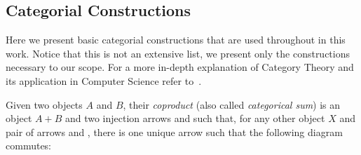 \subsection{Categorial Constructions}

Here we present basic categorial constructions that are used throughout in this work. Notice that this is not an extensive list, we present only the constructions necessary to our scope. For a more in-depth explanation of Category Theory and its application in Computer Science refer to~\cite{Pierce1991}.

\begin{definition}[Coproduct] Given two objects $A$ and $B$, their \emph{coproduct} (also called \emph{categorical sum}) is an object $A+B$ and two injection arrows  and  such that, for any other object $X$ and pair of arrows  and , there is one unique arrow  such that the following diagram commutes:


\end{definition}

